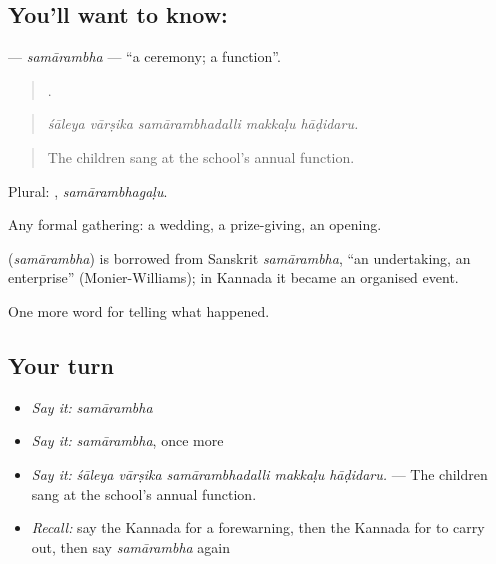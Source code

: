 \subsection*{You'll want to know: }
\textbf{} — \emph{samārambha} — \textquotedblleft{}a ceremony; a function\textquotedblright{}.

\begin{quote}
    .
\end{quote}

\begin{quote}
\emph{śāleya vārṣika samārambhadalli makkaḷu hāḍidaru.}
\end{quote}

\begin{quote}
The children sang at the school's annual function.
\end{quote}

Plural: , \emph{samārambhagaḷu}.

Any formal gathering: a wedding, a prize-giving, an opening.

\begin{cousinweb}
\textbf{} (\emph{samārambha}) is borrowed from Sanskrit \emph{samārambha}, \textquotedblleft{}an undertaking, an enterprise\textquotedblright{} (Monier-Williams); in Kannada it became an organised event.
\end{cousinweb}

\begin{grammarlens}[title={What you've built}]
One more word for telling what happened.
\end{grammarlens}

\subsection*{Your turn}
\begin{itemize}
\raggedright
  \item \emph{Say it:} \emph{samārambha}
  \item \emph{Say it:} \emph{samārambha}, once more
  \item \emph{Say it:} \emph{śāleya vārṣika samārambhadalli makkaḷu hāḍidaru.} — The children sang at the school's annual function.
  \item \emph{Recall:} say the Kannada for a forewarning, then the Kannada for to carry out, then say \emph{samārambha} again
\end{itemize}

